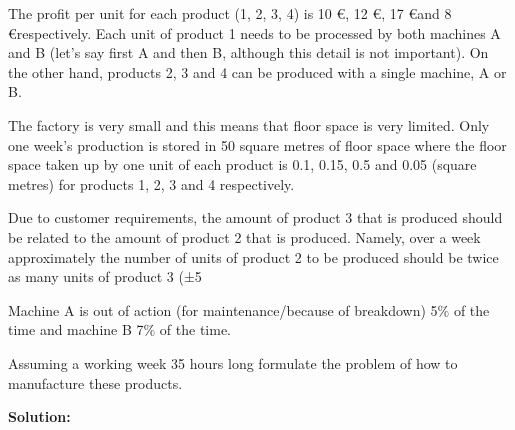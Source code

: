 \documentclass[a4paper,10pt]{article}
\begin{document}
The profit per unit for each product (1, 2, 3, 4) is 10 \euro, 12 \euro, 17 \euro and 8 \euro respectively.
Each unit of product 1 needs to be processed by both machines A and B (let’s say first A and
then B, although this detail is not important). On the other hand, products 2, 3 and 4 can be
produced with a single machine, A or B.

The factory is very small and this means that floor space is very limited. Only one week’s
production is stored in 50 square metres of floor space where the floor space taken up by one unit
of each product is 0.1, 0.15, 0.5 and 0.05 (square metres) for products 1, 2, 3 and 4 respectively.

Due to customer requirements, the amount of product 3 that is produced should be related to
the amount of product 2 that is produced. Namely, over a week approximately the number of
units of product 2 to be produced should be twice as many units of product 3 (±5%

Machine A is out of action (for maintenance/because of breakdown) 5$\%$ of the time and machine
B 7$\%$ of the time.

Assuming a working week 35 hours long formulate the problem of how to manufacture these
products.

\medskip
\textbf{Solution:}
\end{document}

